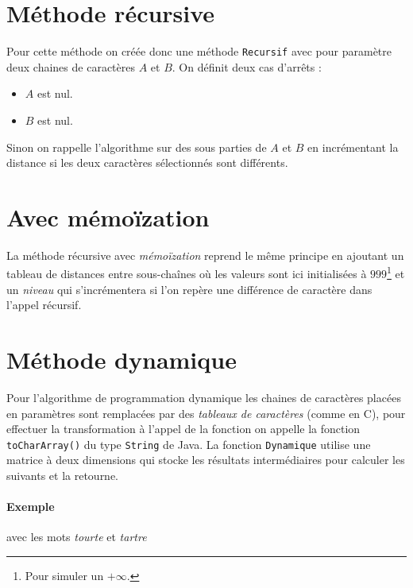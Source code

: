 \documentclass[12pt, a4paper]{report}
\begin{document}
{    \section{Méthode récursive}

    Pour cette méthode on créée donc une méthode \texttt{Recursif} avec pour paramètre deux chaines de caractères $A$ et $B$. On définit deux cas d'arrêts :
    \begin{itemize}
        \item $A$ est nul.
        \item $B$ est nul.
    \end{itemize}
    Sinon on rappelle l'algorithme sur des sous parties de $A$ et $B$ en incrémentant la distance si les deux caractères sélectionnés sont différents.

    \section{Avec mémoïzation}

    La méthode récursive avec \emph{mémoïzation} reprend le même principe en ajoutant un tableau de distances entre sous-chaînes où les valeurs sont ici initialisées à $999$\footnote{Pour simuler un $+\infty$.} et un \emph{niveau} qui s'incrémentera si l'on repère une différence de caractère dans l'appel récursif.

    \section{Méthode dynamique}

    Pour l'algorithme de programmation dynamique les chaines de caractères placées en paramètres sont remplacées par des \emph{tableaux de caractères} (comme en C), pour effectuer la transformation à l'appel de la fonction on appelle la fonction \texttt{toCharArray()} du type \texttt{String} de Java. La fonction \texttt{Dynamique} utilise une matrice à deux dimensions qui stocke les résultats intermédiaires pour calculer les suivants et la retourne.

    \paragraph{Exemple} avec les mots \emph{tourte} et \emph{tartre}

}
\end{document}
